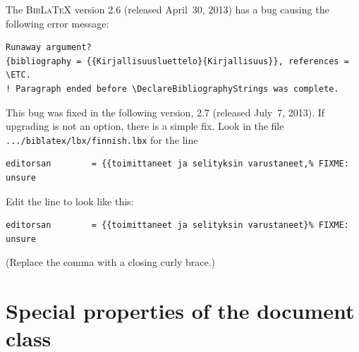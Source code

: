 \documentclass[utf8,english]{gradu3}
\begin{document}
The \textsc{Bib\LaTeX} version 2.6 (released April~30, 2013) has a bug
causing the following error message:%
{\footnotesize%
\begin{verbatim}
Runaway argument?
{bibliography = {{Kirjallisuusluettelo}{Kirjallisuus}}, references = \ETC.
! Paragraph ended before \DeclareBibliographyStrings was complete.
\end{verbatim}
}%
This bug was fixed in the following version, 2.7 (released July~7,
2013).  If upgrading is not an option, there is a simple fix.  Look in
the file \texttt{.../biblatex/lbx/finnish.lbx} for the line
{\footnotesize%
\begin{verbatim}
editorsan        = {{toimittaneet ja selityksin varustaneet,% FIXME: unsure
\end{verbatim}
}%
Edit the line to look like this:
{\footnotesize%
\begin{verbatim}
editorsan        = {{toimittaneet ja selityksin varustaneet}% FIXME: unsure
\end{verbatim}
}%
(Replace the comma with a closing curly brace.)


\chapter{Special properties of the document class}
\end{document}
